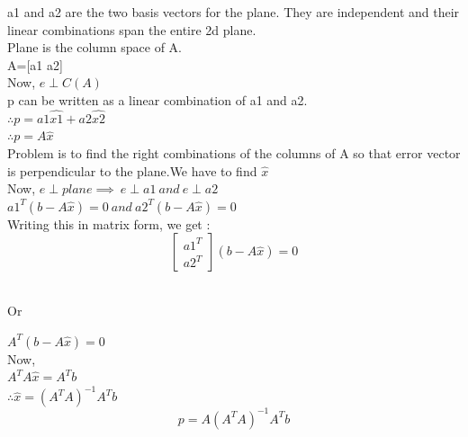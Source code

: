 \documentclass[]{article}
\begin{document}
\vspace{10pt}

a1 and a2 are the two basis vectors for the plane. They are independent and their linear combinations span the entire 2d plane.\\

Plane is the column space of A.\\

A=[a1 a2]\\

Now, $e \perp C(A)$\\

p can be written as a linear combination of a1 and a2.\\

$\therefore p =a1\hat{x1} + a2\hat{x2}$\\

$\therefore p=A\hat{x}$\\

Problem is to find the right combinations of the columns of A so that error vector is perpendicular to the plane.We have to find $\hat{x}$\\

Now, $e \perp plane \implies \ e \perp a1 \ and \ e \perp a2$\\

$a1^T(b-A\hat{x})=0 \ and \ a2^T(b-A\hat{x})=0$\\

Writing this in matrix form, we get :\\

\[
\begin{bmatrix}
a1^T \\
a2^T
	
\end{bmatrix}(b-A\hat{x})=0
\]\\

\begin{center}
	Or 
\end{center}

$A^T(b-A\hat{x})=0$\\

Now,\\

$A^TA\hat{x}=A^Tb$\\

$\therefore \hat{x}={(A^TA)}^{-1}A^Tb$\\

\begin{equation}
	p=A{(A^TA)}^{-1}A^Tb
\end{equation}
\vspace{10pt}
\end{document}
